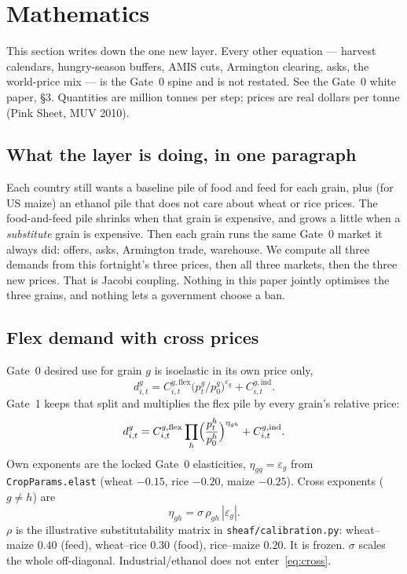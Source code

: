 \section{Mathematics}
\label{sec:math}

This section writes down the one new layer. Every other equation --- harvest
calendars, hungry-season buffers, AMIS cuts, Armington clearing, asks, the
world-price mix --- is the Gate~0 spine and is not restated. See the Gate~0
white paper, \S3. Quantities are million tonnes per step; prices are real
dollars per tonne (Pink Sheet, MUV 2010).

\subsection{What the layer is doing, in one paragraph}

Each country still wants a baseline pile of food and feed for each grain,
plus (for US maize) an ethanol pile that does not care about wheat or rice
prices. The food-and-feed pile shrinks when that grain is expensive, and
grows a little when a \emph{substitute} grain is expensive. Then each grain
runs the same Gate~0 market it always did: offers, asks, Armington trade,
warehouse. We compute all three demands from this fortnight's three prices,
then all three markets, then the three new prices. That is Jacobi coupling.
Nothing in this paper jointly optimises the three grains, and nothing lets
a government choose a ban.

\subsection{Flex demand with cross prices}
\label{sec:flex}

Gate~0 desired use for grain \(g\) is isoelastic in its own price only,
\begin{equation}
\label{eq:own}
d^g_{i,t}
= C^{g,\mathrm{flex}}_{i,t}
  \bigl(p^g_t/p^g_0\bigr)^{\varepsilon_g}
+ C^{g,\mathrm{ind}}_{i,t}.
\end{equation}
Gate~1 keeps that split and multiplies the flex pile by every grain's
relative price:
\begin{equation}
\label{eq:flex}
d^g_{i,t}
= C^{g,\mathrm{flex}}_{i,t}
  \prod_h \Bigl(\frac{p^h_t}{p^h_0}\Bigr)^{\eta_{gh}}
+ C^{g,\mathrm{ind}}_{i,t}.
\end{equation}
Own exponents are the locked Gate~0 elasticities,
\(\eta_{gg}=\varepsilon_g\) from \texttt{CropParams.elast} (wheat \(-0.15\),
rice \(-0.20\), maize \(-0.25\)). Cross exponents (\(g\neq h\)) are
\begin{equation}
\label{eq:cross}
\eta_{gh}=\sigma\,\rho_{gh}\,|\varepsilon_g|.
\end{equation}
\(\rho\) is the illustrative substitutability matrix in
\texttt{sheaf/calibration.py}: wheat--maize \(0.40\) (feed), wheat--rice
\(0.30\) (food), rice--maize \(0.20\). It is frozen. \(\sigma\) scales the
whole off-diagonal. Industrial/ethanol does not enter~\eqref{eq:cross}.

